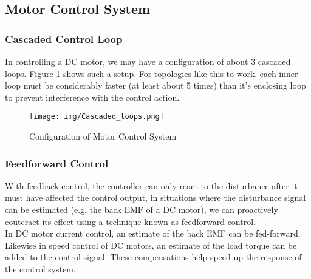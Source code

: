 \documentclass[a4paper]{article}
\begin{document}
\subsection{Motor Control System}

\subsubsection{Cascaded Control Loop}

In controlling a DC motor, we may have a configuration of about 3 cascaded loops. Figure \ref{fig:Cascaded} shows such a setup. 
For topologies like this to work, each inner loop must be considerably faster (at least about 5 times) than it's enclosing loop 
to prevent interference with the control action. \\

\begin{figure}
        \centering
        \texttt{[image: img/Cascaded\_loops.png]}
        \caption{Configuration of Motor Control System \cite{kim17}}
        \label{fig:Cascaded}
\end{figure}


\subsubsection{Feedforward Control}

With feedback control, the controller can only react to the disturbance after it must have affected the control output, 
in situations where the disturbance signal can be estimated (e.g. the back EMF of a DC motor), we can proactively couteract its effect 
using a technique known as feedforward control.\\

In DC motor current control, an estimate of the back EMF can be fed-forward. Likewise in speed control of DC motors, an estimate of 
the load torque can be added to the control signal. These compensations help speed up the response of the control system. 
\end{document}
